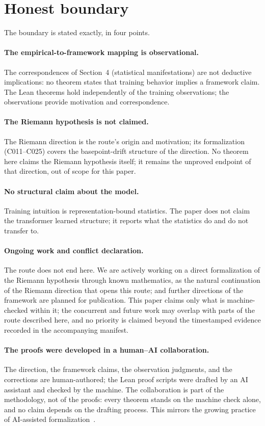 \documentclass[sigplan,10pt,anonymous,review]{acmart}
\begin{document}
\section{Honest boundary}

The boundary is stated exactly, in four points.

\paragraph{The empirical-to-framework mapping is observational.}
The correspondences of Section~4 (statistical manifestations) are not
deductive implications: no theorem states that training behavior
implies a framework claim. The Lean theorems hold independently of the
training observations; the observations provide motivation and
correspondence.

\paragraph{The Riemann hypothesis is not claimed.} The Riemann
direction is the route's origin and motivation; its formalization
(C011--C025) covers the basepoint-drift structure of the direction.
No theorem here claims the Riemann hypothesis itself; it remains the
unproved endpoint of that direction, out of scope for this paper.

\paragraph{No structural claim about the model.}
Training intuition is representation-bound statistics. The paper does
not claim the transformer learned structure; it reports what the
statistics do and do not transfer to.

\paragraph{Ongoing work and conflict declaration.} The route
does not end here. We are actively working on a direct formalization
of the Riemann hypothesis through known mathematics, as the natural
continuation of the Riemann direction that opens this route; and
further directions of the framework are planned for publication.
This paper claims only what is machine-checked within it; the
concurrent and future work may overlap with parts of the route
described here, and no priority is claimed beyond the timestamped
evidence recorded in the accompanying manifest.

\paragraph{The proofs were developed in a human--AI collaboration.}
The direction, the framework claims, the observation judgments, and
the corrections are human-authored; the Lean proof scripts were
drafted by an AI assistant and checked by the machine. The
collaboration is part of the methodology, not of the proofs: every
theorem stands on the machine check alone, and no claim depends on
the drafting process. This mirrors the growing practice of
AI-assisted formalization~\cite{yang2023leandojo, song2024leancopilot,
lin2024leantar, xin2024deepseekprover}.
\end{document}
